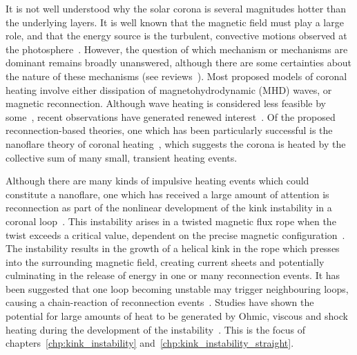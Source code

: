 It is not well understood why the solar corona is several magnitudes hotter than the underlying layers. It is well known that the magnetic field must play a large role, and that the energy source is the turbulent, convective motions observed at the photosphere~\cite{browningMechanismsSolarCoronal1991}. However, the question of which mechanism or mechanisms are dominant remains broadly unanswered, although there are some certainties about the nature of these mechanisms (see reviews~\cite{demoortelRecentAdvancesCoronal2015,realeCoronalLoopsObservations2014}). Most proposed models of coronal heating involve either dissipation of magnetohydrodynamic (MHD) waves, or magnetic reconnection. Although wave heating is considered less feasible by some~\cite{klimchukSolvingCoronalHeating2006a}, recent observations have generated renewed interest~\cite{hahnEvidenceWaveHeating2013,demoortelRecentAdvancesCoronal2015,mcintoshAlfvenicWavesSufficient2011,jessAlfvenWavesLower2009,depontieuChromosphericAlfvenicWaves2007}. Of the proposed reconnection-based theories, one which has been particularly successful is the nanoflare theory of coronal heating~\cite{klimchukSolvingCoronalHeating2006a}, which suggests the corona is heated by the collective sum of many small, transient heating events. 

Although there are many kinds of impulsive heating events which could constitute a nanoflare, one which has received a large amount of attention is reconnection as part of the nonlinear development of the kink instability in a coronal loop~\cite{hoodKinkInstabilitySolar1979,browningSolarCoronalHeating2003c,hoodCoronalHeatingMagnetic2009,browningHeatingCoronaNanoflares2008a}. This instability arises in a twisted magnetic flux rope when the twist exceeds a critical value, dependent on the precise magnetic configuration~\cite{hoodCoronalHeatingMagnetic2009}. The instability results in the growth of a helical kink in the rope which presses into the surrounding magnetic field, creating current sheets and potentially culminating in the release of energy in one or many reconnection events. It has been suggested that one loop becoming unstable may trigger neighbouring loops, causing a chain-reaction of reconnection events~\cite{hoodMHDAvalancheModel2015}. Studies have shown the potential for large amounts of heat to be generated by Ohmic, viscous and shock heating during the development of the instability~\cite{barefordShockHeatingNumerical2015,hoodCoronalHeatingMagnetic2009}. This is the focus of chapters~\ref{chp:kink_instability} and~\ref{chp:kink_instability_straight}.

